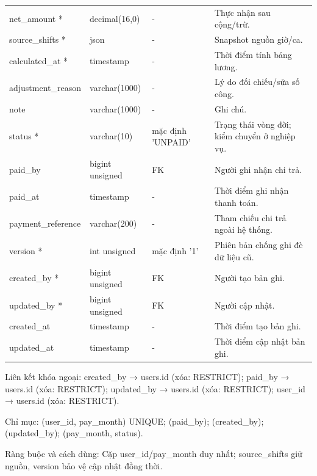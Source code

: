 {\begin{longtable}{@{}L{\textwidth-4.86pt\relax} L{\textwidth-3.96pt\relax} L{\textwidth-2.88pt\relax} L{\textwidth-6.3pt\relax}@{}}
net\_\allowbreak{}amount * & decimal(16,0) & - & Thực nhận sau cộng/\allowbreak{}trừ.\allowbreak{}\\[1pt]
source\_\allowbreak{}shifts * & json & - & Snapshot nguồn giờ/\allowbreak{}ca.\allowbreak{}\\[1pt]
calculated\_\allowbreak{}at * & timestamp & - & Thời điểm tính bảng lương.\allowbreak{}\\[1pt]
adjustment\_\allowbreak{}reason & varchar(1000) & - & Lý do đối chiếu/\allowbreak{}sửa số công.\allowbreak{}\\[1pt]
note & varchar(1000) & - & Ghi chú.\allowbreak{}\\[1pt]
status * & varchar(10) & mặc định 'UNPAID' & Trạng thái vòng đời; kiểm chuyển ở nghiệp vụ.\allowbreak{}\\[1pt]
paid\_\allowbreak{}by & bigint unsigned & FK & Người ghi nhận chi trả.\allowbreak{}\\[1pt]
paid\_\allowbreak{}at & timestamp & - & Thời điểm ghi nhận thanh toán.\allowbreak{}\\[1pt]
payment\_\allowbreak{}reference & varchar(200) & - & Tham chiếu chi trả ngoài hệ thống.\allowbreak{}\\[1pt]
version * & int unsigned & mặc định '1' & Phiên bản chống ghi đè dữ liệu cũ.\allowbreak{}\\[1pt]
created\_\allowbreak{}by * & bigint unsigned & FK & Người tạo bản ghi.\allowbreak{}\\[1pt]
updated\_\allowbreak{}by * & bigint unsigned & FK & Người cập nhật.\allowbreak{}\\[1pt]
created\_\allowbreak{}at & timestamp & - & Thời điểm tạo bản ghi.\allowbreak{}\\[1pt]
updated\_\allowbreak{}at & timestamp & - & Thời điểm cập nhật bản ghi.\allowbreak{}\\[1pt]
\end{longtable}}
Liên kết khóa ngoại:\allowbreak{} created\_\allowbreak{}by → users.\allowbreak{}id (xóa:\allowbreak{} RESTRICT); paid\_\allowbreak{}by → users.\allowbreak{}id (xóa:\allowbreak{} RESTRICT); updated\_\allowbreak{}by → users.\allowbreak{}id (xóa:\allowbreak{} RESTRICT); user\_\allowbreak{}id → users.\allowbreak{}id (xóa:\allowbreak{} RESTRICT).\allowbreak{}

Chỉ mục:\allowbreak{} (user\_\allowbreak{}id, pay\_\allowbreak{}month) UNIQUE; (paid\_\allowbreak{}by); (created\_\allowbreak{}by); (updated\_\allowbreak{}by); (pay\_\allowbreak{}month, status).\allowbreak{}

Ràng buộc và cách dùng:\allowbreak{} Cặp user\_\allowbreak{}id/\allowbreak{}pay\_\allowbreak{}month duy nhất; source\_\allowbreak{}shifts giữ nguồn, version bảo vệ cập nhật đồng thời.\allowbreak{}

